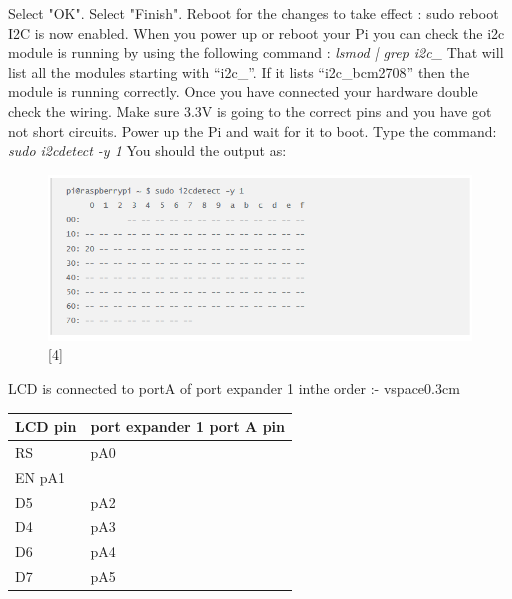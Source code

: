 \documentclass[11pt,a4paper]{report}
\begin{document}
\begin{flushleft}
Select "OK".\newline
 \newline
	   Select "Finish".\newline
	 \newline
	    Reboot for the changes to take effect :\newline
sudo reboot\newline
I2C is now enabled.\vspace{0.2cm}\newline
When you power up or reboot your Pi you can check the i2c module is running by using the following command : \newline \textit{lsmod | grep i2c\_} \newline That will list all the modules starting with “i2c\_”. If it lists “i2c\_bcm2708” then the module is running correctly.\newline
		 Once you have connected your hardware double check the wiring. Make sure 3.3V is going to the correct pins and you have got not short circuits. Power up the Pi and wait for it to boot.\newline
		Type the command: \newline \textit{sudo i2cdetect -y 1} \newline
		You should the output as:\newline
			\begin{figure}[h!]
				\includegraphics[scale=0.6]{i2c_9.png}
				\centering
				\caption{[4]}
			\end{figure}
			LCD is connected to portA of port expander 1 inthe order :-	
			vspace{0.3cm}
	
	\centering
	\begin{tabular}{ |p{3cm}|p{3cm}| }
	

 \hline
 LCD pin& port expander 1 port A pin\\
 \hline
 RS&pA0\\
 \hline
 EN pA1\\
 \hline
 D5&pA2\\
 \hline
 D4&pA3\\
 \hline
 D6&pA4\\
 \hline
 D7&pA5\\
 \hline


\end{tabular}
\end{flushleft}
\end{document}
